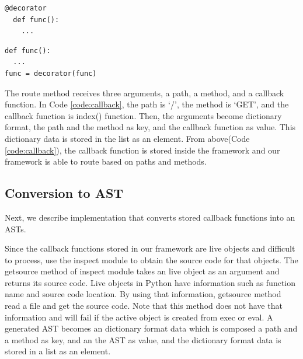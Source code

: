 \documentclass[conference]{IEEEtran}
\begin{document}
\begin{lstlisting}[caption={Python decorator.}, label=code:decorator, captionpos=b]
@decorator
  def func():
    ...
\end{lstlisting}

\begin{lstlisting}[caption={Source code synonymous with Code \ref{code:decorator2}.}, captionpos=b]
def func():
  ...
func = decorator(func)
\end{lstlisting}

The route method receives three arguments, a path, a method, and a callback function.
In Code \ref{code:callback}, the path is `/', the method is `GET', and the callback function is index() function.
Then, the arguments become dictionary format, the path and the method as key, and the callback function as value.
This dictionary data is stored in the list as an element.
From above(Code \ref{code:callback}), the callback function is stored inside the framework and our framework is able to route based on paths and methods.

\subsection{Conversion to AST}
Next, we describe implementation that converts stored callback functions into an ASTs.

Since the callback functions stored in our framework are live objects and difficult to process, use the inspect module to obtain the source code for that objects.
The getsource method of inspect module takes an live object as an argument and returns its source code.
Live objects in Python have information such as function name and source code location.
By using that information, getsource method read a file and get the source code.
Note that this method does not have that information and will fail if the active object is created from exec or eval.
A generated AST becomes an dictionary format data which is composed a path and a method as key, and an the AST as value, and the dictionary format data is stored in a list as an element.
\end{document}
